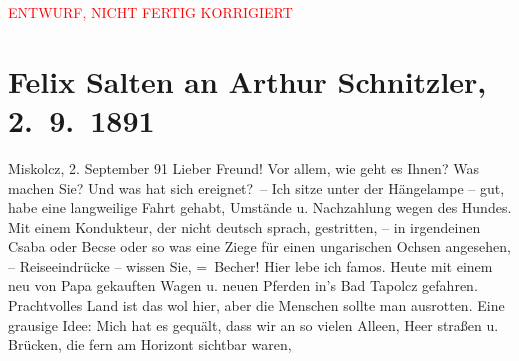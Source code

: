 
\begin{center}
            \textcolor{red}{ENTWURF, NICHT FERTIG KORRIGIERT}
                      \end{center}
            
         
         \renewcommand{\erwaehntePersonen}{Personen:  ?? [Partnerin von Paul Goldmann und später Felix Salten], Paula Makay, Philipp Salzmann, Michael Emil Salzmann, Ignaz Salzmann, Theodor Salzmann, Geza Sós}
         \renewcommand{\erwaehnteInstitutionen}{Institutionen: Danzer’s Orpheum}
         \renewcommand{\erwaehnteOrte}{Orte: Miskolc, Miskolctapolca, Mödling, Wien}
         \renewcommand{\erwaehnteWerke}{}
               \section[Felix Salten an Arthur Schnitzler, 2. 9. 1891]{ Felix Salten an Arthur Schnitzler, 2. 9. 1891}\nopagebreak{}\rehead{ }\begin{ledgroupsized}[t]{13cm}\normalsize\beginnumbering \toendnotes[C]{\smallbreak\pagebreak[2]} 
\toendnotes[C]{\smallbreak}\pstart
           {\pb}Miskolcz, 2. September 91\pend
           \pstart
           Lieber Freund! Vor allem, wie geht es Ihnen? Was machen Sie? Und was
               hat sich ereignet? –\pend
           \pstart
           Ich sitze unter der Hängelampe – gut, habe eine langweilige Fahrt gehabt, Umstände u.
               Nachzahlung wegen des Hundes. Mit einem Kondukteur, der nicht deutsch sprach,
               gestritten, – in irgendeinen Csaba oder Becse oder so was eine Ziege für einen
               ungarischen Ochsen angesehen, – Reiseeindrücke – wissen Sie, = Becher!\pend
           \pstart
           {\pb}Hier lebe ich famos. Heute mit
               einem neu von Papa
               gekauften Wagen u. neuen Pferden in’s Bad
                  Tapolcz gefahren. Prachtvolles Land ist das wol hier, aber die Menschen
               sollte man ausrotten. \pend
           \pstart
           Eine grausige Idee: Mich hat es gequält, dass wir an so vielen Alleen, Heer straßen
               u. Brücken,  die fern am Horizont sichtbar waren,

\end{ledgroupsized}
